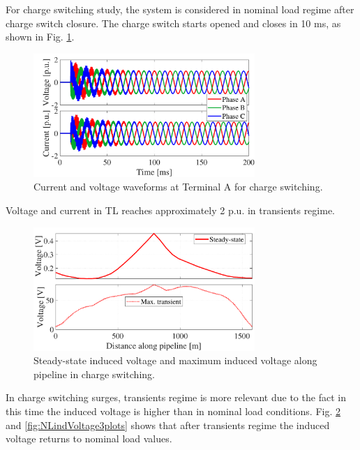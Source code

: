\documentclass[5p,twocolumn]{elsarticle}
\begin{document}
For charge switching study, the system is considered in nominal load regime after charge switch closure. The charge switch starts opened and closes in 10 ms, as shown in Fig. \ref{fig:ENindVoltageTL}.

\begin{figure}[h]
	\begin{center}
		\includegraphics[width=8.4cm]{img/ENindVoltage_TL.pdf}    %
		\caption{Current and voltage waveforms at Terminal A for charge switching.} 
		\label{fig:ENindVoltageTL}
	\end{center}
\end{figure}

Voltage and current in TL reaches approximately 2 p.u. in transients regime.

\begin{figure}[h]
	\begin{center}
		\includegraphics[width=8.4cm]{img/ENindVoltage.pdf}    %
		\caption{Steady-state induced voltage and maximum induced voltage along pipeline in charge switching.} 
		\label{fig:ENindVoltage}
	\end{center}
\end{figure}

In charge switching surges, transients regime is more relevant due to the fact in this time the induced voltage is higher than in nominal load conditions. Fig. \ref{fig:ENindVoltage} and \ref{fig:NLindVoltage3plots} shows that after transients regime the induced voltage returns to nominal load values.
\end{document}
